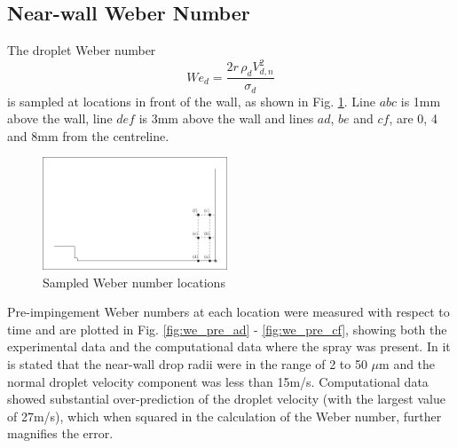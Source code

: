 \documentclass[a4paper,10pt]{article}
\begin{document}
\subsection{Near-wall Weber Number}
The droplet Weber number
\begin{equation}
We_d = \frac{2r\,\rho_d V_{d,n}^2 }{\sigma_d}
\end{equation}
is sampled at locations in front of the wall, as shown in Fig. \ref{fig:park_we}. Line $abc$ is 1mm above the wall, line $def$ is 3mm above the wall and lines $ad$, $be$ and $cf$, are 0, 4 and 8mm from the centreline.
\begin{figure}[H]
\centering
\includegraphics[width=0.49\textwidth]{we_loc.eps}
\caption{Sampled Weber number locations}
\label{fig:park_we}
\end{figure}


Pre-impingement Weber numbers at each location were measured with respect to time and are plotted in Fig. \ref{fig:we_pre_ad} - \ref{fig:we_pre_cf}, showing both the experimental data and the computational data where the spray was present. In \cite{park2004} it is stated that the near-wall drop radii were in the range of 2 to 50 $\mu$m and the normal droplet velocity component was less than 15m/s. Computational data showed substantial over-prediction of the droplet velocity (with the largest value of 27m/s), which when squared in the calculation of the Weber number, further magnifies the error.
\end{document}

